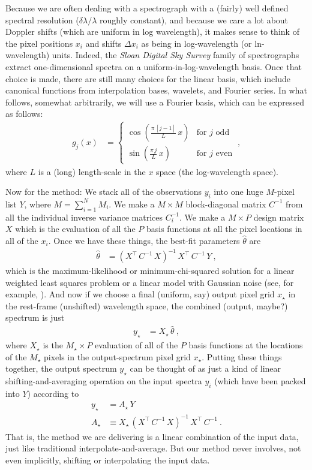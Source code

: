 \documentclass[11pt]{article}
\begin{document}
Because we are often dealing with a spectrograph with a (fairly) well defined spectral resolution ($\delta\lambda/\lambda$ roughly constant), and because we care a lot about Doppler shifts (which are uniform in log wavelength), it makes sense to think of the pixel positions $x_i$ and shifts $\Delta x_i$ as being in log-wavelength (or ln-wavelength) units.
Indeed, the \textsl{Sloan Digital Sky Survey} family of spectrographs extract one-dimensional spectra on a uniform-in-log-wavelength basis.
Once that choice is made, there are still many choices for the linear basis,
which include canonical functions from interpolation bases, wavelets, and Fourier series.
In what follows, somewhat arbitrarily, we will use a Fourier basis, which can be expressed as follows:
\begin{align}
    g_j(x) & = \left\{\begin{array}{cl}\displaystyle\cos\left(\frac{\pi\,[j-1]}{L}\,x\right) & \mbox{for $j$ odd} \\[3ex]
                                       \displaystyle\sin\left(\frac{\pi\,j}{L}\,x\right) & \mbox{for $j$ even}\end{array}\right. ~,
\end{align}
where $L$ is a (long) length-scale in the $x$ space (the log-wavelength space).

Now for the method:
We stack all of the observations $y_i$ into one huge $M$-pixel list $Y$, where $M=\sum_{i=1}^N M_i$.
We make a $M\times M$ block-diagonal matrix $C^{-1}$ from all the individual inverse variance matrices $C_i^{-1}$.
We make a $M\times P$ design matrix $X$ which is the evaluation of all the $P$ basis functions at all the pixel locations in all of the $x_i$.
Once we have these things, the best-fit parameters $\hat\theta$ are
\begin{align}
    \hat\theta &= (X^\top\,C^{-1}\,X)^{-1}\,X^\top\,C^{-1}\,Y ~,
\end{align}
which is the maximum-likelihood or minimum-chi-squared solution for a linear weighted least squares problem or a linear model with Gaussian noise (see, for example, \cite{hoggfitting}).
And now if we choose a final (uniform, say) output pixel grid $x_\star$ in the rest-frame (unshifted) wavelength space, the combined (output, maybe?) spectrum is just
\begin{align}
    y_\star &= X_\star\,\hat\theta ~,
\end{align}
where $X_\star$ is the $M_\star\times P$ evaluation of all of the $P$ basis functions at the locations of the $M_\star$ pixels in the output-spectrum pixel grid $x_\star$.
Putting these things together, the output spectrum $y_\star$ can be thought of as just a kind of linear shifting-and-averaging operation on the input spectra $y_i$ (which have been packed into $Y$) according to
\begin{align}
    y_\star &= A_\star\,Y \\
    A_\star &\equiv X_\star\,(X^\top\,C^{-1}\,X)^{-1}\,X^\top\,C^{-1} ~.
\end{align}
That is, the method we are delivering is a linear combination of the input data, just like traditional interpolate-and-average.
But our method never involves, not even implicitly, shifting or interpolating the input data.
\end{document}
